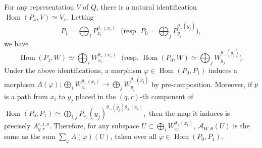 \documentclass[a4paper]{amsart}
\numberwithin{equation}{section}
\theoremstyle{plain}
\theoremstyle{definition}
\DeclareMathOperator{\Hom}{Hom}
\begin{document}
For any representation $V$ of $Q$, there is a natural identification $\Hom(P_x,V)\simeq V_x$. Letting $$P_1=\bigoplus_i P_{x_i}^{\theta_{+}(x_i)}\text{ } \big(\text{resp. }P_0=\bigoplus_j P_{y_j}^{\theta_{-}(y_j)}\big),$$ we have 
\begin{equation*}
\Hom(P_1,W)\simeq \bigoplus_i W_{x_i}^{\theta_{+}(x_i)}\text{ }\big(\text{resp. }\Hom(P_0,W)\simeq \bigoplus_{j}W_{y_j}^{\theta_{-}(y_j)}\big).\end{equation*}
Under the above identifications, a morphism $\varphi\in\Hom(P_0,P_1)$ induces a morphism $A(\varphi):\bigoplus_{i}W_{x_i}^{\theta_{+}(x_i)}\rightarrow \bigoplus_{j}W_{y_j}^{\theta_{-}(y_j)}$ by pre-composition. Moreover, if $p$ is a path from $x_i$ to $y_j$ placed in the $(q,r)$-th component of $\Hom(P_0,P_1)\simeq\bigoplus_{i,j}P_{x_i}(y_j)^{\theta_{-}(y_j)\theta_{+}(x_i)},$ then the map it induces is precisely $A^{i,j,p}_{q,r}$. Therefore, for any subspace $U\subset \bigoplus_{i}W_{x_i}^{\theta_{+}(x_i)}$, $\mathcal{A}_{W,\theta}(U)$ is the same as the sum $\sum_{\varphi}A(\varphi)(U)$, taken over all $\varphi\in\Hom(P_0,P_1)$. 
\end{document}
